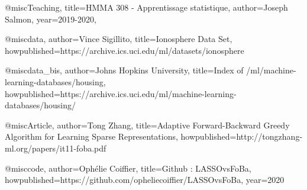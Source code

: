 @misc{Teaching,
     title={H{MMA} 308 - Apprentissage statistique},
     author={Joseph Salmon},
     year={2019-2020},
}

@misc{data,
    author={Vince Sigillito},
    title={Ionosphere Data Set},
    howpublished={https://archive.ics.uci.edu/ml/datasets/ionosphere}
}

@misc{data_bis,
    author={Johns Hopkins University},
    title={Index of /ml/machine-learning-databases/housing},
    howpublished={https://archive.ics.uci.edu/ml/machine-learning-databases/housing/}
}

@misc{Article,
    author={Tong Zhang},
    title={Adaptive Forward-Backward Greedy Algorithm for Learning Sparse Representations},
    howpublished={http://tongzhang-ml.org/papers/it11-foba.pdf}
}

@misc{code,
    author={Ophélie Coiffier},
    title={Github : LASSOvsFoBa},
    howpublished={https://github.com/opheliecoiffier/LASSOvsFoBa},
    year={2020}
}